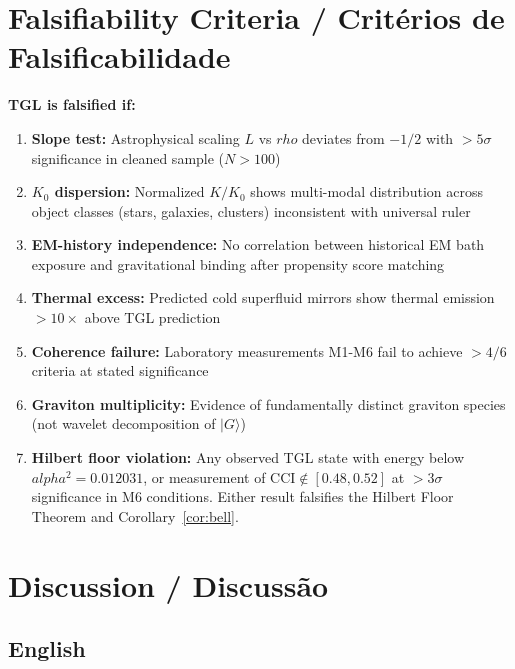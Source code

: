 \documentclass[12pt,a4paper]{article}
\def\alpha{alpha}%
\def\rho{rho}%
\begin{document}
\section{Falsifiability Criteria / Critérios de Falsificabilidade}

\textbf{TGL is falsified if:}

\begin{enumerate}
    \item[\textbf{(R1)}] \textbf{Slope test:} Astrophysical scaling $L$ vs $\rho$ deviates from $-1/2$ with $>5\sigma$ significance in cleaned sample ($N > 100$)
    
    \item[\textbf{(R2)}] \textbf{$K_0$ dispersion:} Normalized $K/K_0$ shows multi-modal distribution across object classes (stars, galaxies, clusters) inconsistent with universal ruler
    
    \item[\textbf{(R3)}] \textbf{EM-history independence:} No correlation between historical EM bath exposure and gravitational binding after propensity score matching
    
    \item[\textbf{(R4)}] \textbf{Thermal excess:} Predicted cold superfluid mirrors show thermal emission $>10\times$ above TGL prediction
    
    \item[\textbf{(R5)}] \textbf{Coherence failure:} Laboratory measurements M1-M6 fail to achieve $>4/6$ criteria at stated significance
    
    \item[\textbf{(R6)}] \textbf{Graviton multiplicity:} Evidence of fundamentally distinct graviton species (not wavelet decomposition of $|G\rangle$)

    \item[\textbf{(R7)}] \textbf{Hilbert floor violation:} Any observed TGL state with energy below $\alpha^2 = 0.012031$, or measurement of $\mathrm{CCI} \notin [0.48, 0.52]$ at $> 3\sigma$ significance in M6 conditions. Either result falsifies the Hilbert Floor Theorem and Corollary~\ref{cor:bell}.
\end{enumerate}

\section{Discussion / Discussão}

\subsection{English}
\end{document}
